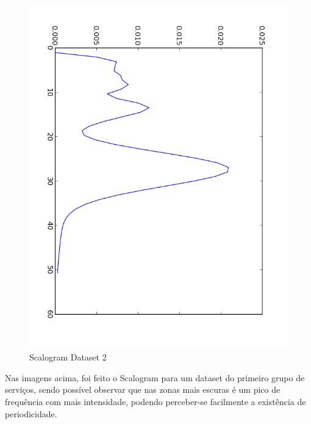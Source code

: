 \documentclass[pdftex,12pt,a4paper]{report}
\begin{document}
\begin{figure}[!htb]
\begin{minipage}[b]{0.4\textwidth}
    \includegraphics[width=\textwidth]{scalogram/scalogramCWT2.png}
    \caption{Scalogram Dataset 2}
    \label{fig:scalogram2}
  \end{minipage}
\end{figure}

Nas imagens acima, foi feito o Scalogram para um dataset do primeiro grupo de serviços, sendo possível observar que nas zonas mais escuras é um pico de frequência com mais intensidade, podendo perceber-se facilmente a existência de periodicidade.
\end{document}

